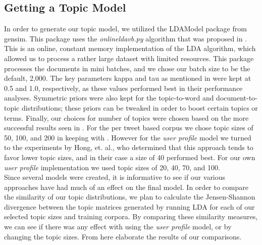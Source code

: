 \documentclass{acm_proc_article-sp}
\begin{document}
\subsection{Getting a Topic Model}
\hspace*{5mm}In order to generate our topic model, we utilized the LDAModel package from gensim. This package uses the \textit{onlineldavb.py} algorithm that was proposed in \cite{hoffman2010online}. This is an online, constant memory implementation of the LDA algorithm, which allowed us to process a rather large dataset with limited resources. This package processes the documents in mini batches, and we chose our batch size to be the default, 2,000. The key parameters kappa and tau as mentioned in \cite{hoffman2010online} were kept at 0.5 and 1.0, respectively, as these values performed best in their performance analyses. Symmetric priors were also kept for the topic-to-word and document-to-topic distributions; these priors can be tweaked in order to boost certain topics or terms. Finally, our choices for number of topics were chosen based on the more successful results seen in \cite{hong2010empirical}. For the per tweet based corpus we chose topic sizes of 50, 100, and 200 in keeping with \cite{godin2013using}. However for the \textit{user profile} model we turned to the experiments by Hong, et. al., who determined that this approach tends to favor lower topic sizes, and in their case a size of 40 performed best. For our own \textit{user profile} implementation we used topic sizes of 20, 40, 70, and 100.\\ 
\hspace*{5mm}Since several models were created, it is informative to see if our various approaches have had much of an effect on the final model. In order to compare the similarity of our topic distributions, we plan to calculate the Jensen-Shannon divergence between the topic matrices generated by running LDA for each of our selected topic sizes and training corpora. By comparing these similarity measures, we can see if there was any effect with using the \textit{user profile} model, or by changing the topic sizes. From here elaborate the results of our comparisons.\\
​
\end{document}
